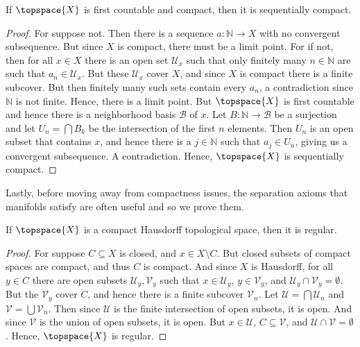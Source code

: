        \begin{theorem}
            \label{thm:First_Countable_Compact_is_Seq_Compact}%
            If $\topspace{X}$ is first countable and compact, then it is
            sequentially compact.
        \end{theorem}
        \begin{proof}
            For suppose not. Then there is a sequence
            $a:\mathbb{N}\rightarrow{X}$ with no convergent subsequence.
            But since $X$ is compact, there must be a limit point. For if
            not, then for all $x\in{X}$ there is an open set
            $\mathcal{U}_{x}$ such that only finitely many $n\in\mathbb{N}$
            are such that $a_{n}\in\mathcal{U}_{x}$. But these
            $\mathcal{U}_{x}$ cover $X$, and since $X$ is compact there is
            a finite subcover. But then finitely many such sets contain
            every $a_{n}$, a contradiction since $\mathbb{N}$ is not finite.
            Hence, there is a limit point. But $\topspace{X}$ is first
            countable and hence there is a neighborhood basis
            $\mathcal{B}$ of $x$. Let $B:\mathbb{N}\rightarrow\mathcal{B}$
            be a surjection and let $U_{n}=\bigcap{B}_{k}$ be the
            intersection of the first $n$ elements. Then $U_{n}$ is an open
            subset that contains $x$, and hence there is a $j\in\mathbb{N}$
            such that $a_{j}\in{U}_{n}$, giving us a convergent subsequence.
            A contradiction. Hence, $\topspace{X}$ is sequentially compact.
        \end{proof}
        Lastly, before moving away from compactness issues, the separation
        axioms that manifolds satisfy are often useful and so we prove them.
        \begin{theorem}
            \label{thm:Compact_Hausdorff_is_Regular}%
            If $\topspace{X}$ is a compact Hausdorff topological space, then
            it is regular.
        \end{theorem}
        \begin{proof}
            For suppose $C\subseteq{X}$ is closed, and $x\in{X}\setminus{C}$.
            But closed subsets of compact spaces are compact, and thus $C$ is
            compact. And since $X$ is Hausdorff, for all $y\in{C}$ there are
            open subsets $\mathcal{U}_{y},\mathcal{V}_{y}$ such that
            $x\in\mathcal{U}_{y}$, $y\in\mathcal{V}_{y}$, and
            $\mathcal{U}_{y}\cap\mathcal{V}_{y}=\emptyset$. But the
            $\mathcal{V}_{y}$ cover $C$, and hence there is a finite subcover
            $\mathcal{V}_{n}$. Let $\mathcal{U}=\bigcap\mathcal{U}_{n}$ and
            $\mathcal{V}=\bigcup\mathcal{V}_{n}$. Then since
            $\mathcal{U}$ is the finite intersection of open subsets, it is
            open. And since $\mathcal{V}$ is the union of open subsets, it is
            open. But $x\in\mathcal{U}$, $C\subseteq\mathcal{V}$, and
            $\mathcal{U}\cap\mathcal{V}=\emptyset$. Hence, $\topspace{X}$ is
            regular.
        \end{proof}
